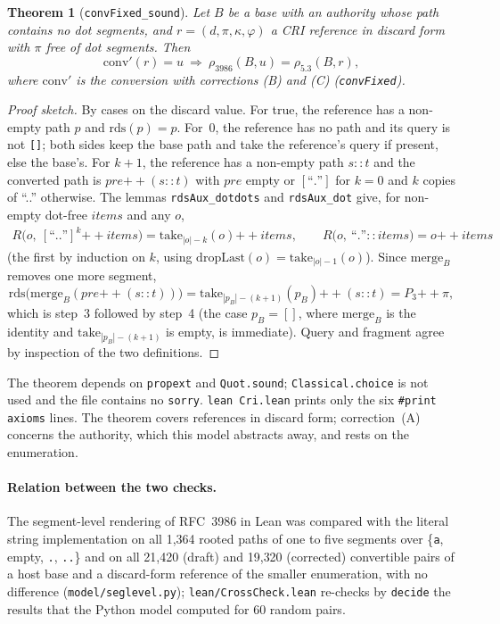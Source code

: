 \documentclass[11pt,a4paper]{article}
\newtheorem{theorem}{Theorem}
\theoremstyle{remark}
\newcommand{\lean}[1]{\texttt{#1}}
\newcommand{\cri}[1]{\texttt{#1}}
\newcommand{\rds}{\mathrm{rds}}
\newcommand{\mergef}{\mathrm{merge}}
\newcommand{\take}[1]{\mathrm{take}_{#1}}
\newcommand{\dl}{\mathrm{dropLast}}
\newcommand{\res}{\rho_{5.3}}
\newcommand{\rfc}{\rho_{3986}}
\newcommand{\conv}{\mathrm{conv}}
\newcommand{\seq}[1]{[#1]}
\begin{document}
\begin{theorem}[\lean{convFixed\_sound}]
Let $B$ be a base with an authority whose path contains no dot segments, and $r=(d,\pi,\kappa,\varphi)$ a
CRI reference in discard form with $\pi$ free of dot segments. Then
\[
\conv'(r)=u\ \Longrightarrow\ \rfc(B,u)=\res(B,r),
\]
where $\conv'$ is the conversion with corrections (B) and (C) (\lean{convFixed}).
\end{theorem}
\begin{proof}[Proof sketch]
By cases on the discard value. For true, the reference has a non-empty path $p$ and $\rds(p)=p$. For~0,
the reference has no path and its query is not \cri{[]}; both sides keep the base path and take the
reference's query if present, else the base's. For $k+1$, the reference has a non-empty path $s{::}t$ and
the converted path is $\mathit{pre}\mathbin{+\!\!+}(s{::}t)$ with $\mathit{pre}$ empty or $[\text{``.''}]$
for $k=0$ and $k$ copies of ``..'' otherwise. The lemmas \lean{rdsAux\_dotdots} and \lean{rdsAux\_dot} give, for non-empty dot-free
$\mathit{items}$ and any $o$,
\begin{gather*}
R\bigl(o,\ \seq{\text{``..''}}^{k}\mathbin{+\!\!+}\mathit{items}\bigr)=\take{|o|-k}(o)\mathbin{+\!\!+}\mathit{items},\qquad
R\bigl(o,\ \text{``.''}::\mathit{items}\bigr)=o\mathbin{+\!\!+}\mathit{items}
\end{gather*}
(the first by induction on $k$, using $\dl(o)=\take{|o|-1}(o)$).
Since $\mergef_B$ removes one more segment,
\[
\rds\bigl(\mergef_B(\mathit{pre}\mathbin{+\!\!+}(s{::}t))\bigr)=\take{|p_B|-(k+1)}(p_B)\mathbin{+\!\!+}(s{::}t)=P_3\mathbin{+\!\!+}\pi ,
\]
which is step~3 followed by step~4 (the case $p_B=\seq{}$, where $\mergef_B$ is the identity and
$\take{|p_B|-(k+1)}$ is empty, is immediate). Query and fragment agree by inspection of the two
definitions.
\end{proof}
\noindent The theorem depends on \lean{propext} and \lean{Quot.sound}; \lean{Classical.choice} is not
used and the file contains no \lean{sorry}. \lean{lean Cri.lean} prints only the six
\lean{\#print axioms} lines. The theorem covers references in discard form; correction~(A) concerns the
authority, which this model abstracts away, and rests on the enumeration.

\paragraph{Relation between the two checks.} The segment-level rendering of RFC~3986 in Lean was
compared with the literal string implementation on all 1{,}364 rooted paths of one to five segments over
\{\cri{a}, empty, \cri{.}, \cri{..}\} and on all 21{,}420 (draft) and 19{,}320 (corrected) convertible
pairs of a host base and a discard-form reference of the smaller enumeration, with no difference
(\lean{model/seglevel.py}); \lean{lean/CrossCheck.lean} re-checks by \lean{decide} the results that the
Python model computed for 60 random pairs.
\end{document}
